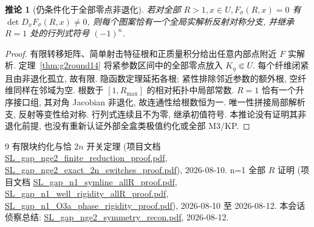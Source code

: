 \documentclass[UTF8]{ctexart}
\newtheorem{corollary}[theorem]{推论}
\begin{document}
\begin{corollary}[仍条件化于全部零点非退化]\label{cor:ndround14}
若对全部 $R>1,x\in U,F_\sigma(R,x)=0$ 有
$\det D_xF_\sigma(R,x)\ne0$, 则每个图案恰有一个全局实解析反射对称分支,
并继承 $R=1$ 处的行列式符号 $(-1)^n$.
\end{corollary}
\begin{proof}
有限转移矩阵、简单射击特征根和正质量积分给出任意内部点附近 $F$ 实解析.
定理~\ref{thm:g2round14} 将紧参数区间中的全部零点放入 $K_\eta\Subset U$.
每个纤维闭紧且由非退化孤立, 故有限. 隐函数定理延拓各根;
紧性排除邻近参数的额外根, 空纤维同样在邻域为空.
根数于 $[1,R_{\max}]$ 的相对拓扑中局部常数.
$R=1$ 恰有一个升序接口组, 其对角 Jacobian 非退化,
故连通性给根数恒为一. 唯一性拼接局部解析支, 反射等变性给对称.
行列式连续且不为零, 继承初值符号. 本推论没有证明其非退化前提,
也没有重新认证外部全盒类极值约化或全部 M3/KP.
\end{proof}

\begin{thebibliography}{9}
 有限块约化与恰 $2n$ 开关定理 (项目文档
\url{SL_gap_nge2_finite_reduction_proof.pdf}, \url{SL_gap_nge2_exact_2n_switches_proof.pdf}),
2026-08-10.
 n=1 全部 $R$ 证明 (项目文档
\url{SL_gap_n1_symline_allR_proof.pdf}, \url{SL_gap_n1_well_rigidity_allR_proof.pdf},
\url{SL_gap_n1_O3a_phase_rigidity_proof.pdf}), 2026-08-10 至 2026-08-12.
 本会话侦察总结: \url{SL_gap_nge2_symmetry_recon.pdf}, 2026-08-12.
\end{thebibliography}
\end{document}
